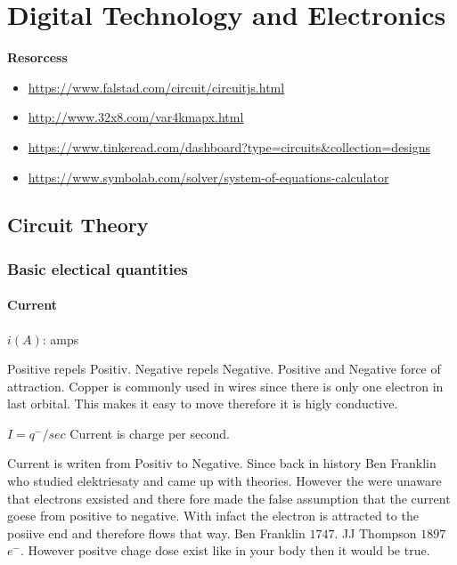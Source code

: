 \chapter{Digital Technology and Electronics}

\textbf{Resorcess}
\begin{itemize}
    \item \url{https://www.falstad.com/circuit/circuitjs.html}
    \item \url{http://www.32x8.com/var4kmapx.html}
    \item \url{https://www.tinkercad.com/dashboard?type=circuits&collection=designs}
    \item \url{https://www.symbolab.com/solver/system-of-equations-calculator}
\end{itemize}

\newpage

\section{Circuit Theory}
\subsection{Basic electical quantities}
\subsubsection{Current}
$i (A)$: amps \newline

Positive repels Positiv. Negative repels Negative. Positive and Negative force of attraction.
Copper is commonly used in wires since there is only one electron in last orbital. This makes it easy
to move therefore it is higly conductive. \newline

$I = q^{-} / sec$ Current is charge per second. \newline

Current is writen from Positiv to Negative. Since back in history Ben Franklin who studied elektriesaty and
came up with theories. However the were unaware that electrons exsisted and there fore made the false
assumption that the current goese from positive to negative. With infact the electron is attracted to
the posiive end and therefore flows that way.
Ben Franklin $1747$.
JJ Thompson $1897$ $e^{-}$.
However positve chage dose exist like in your body then it would be true. \newline


